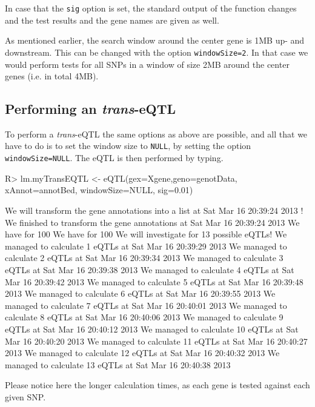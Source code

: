 \documentclass[a4paper,10pt]{article}
\begin{document}
In case that the \texttt{sig} option is set, the standard output of the function changes and the test results and the gene names
are given as well.

As mentioned earlier, the search window around the center gene is 1MB up- and downstream. This can be changed with the option
\texttt{windowSize=2}. In that case we would perform tests for all SNPs in a window of size 2MB around the center genes (i.e.
in total 4MB).


\subsection{Performing an \textit{trans}-eQTL}
To perform a \textit{trans}-eQTL the same options as above are possible, and all that we have to do is to set the window size to
\texttt{NULL}, by setting the option \texttt{windowSize=NULL}. The eQTL is then performed by typing.
\begin{Schunk}
\begin{Sinput}
R> lm.myTransEQTL <- eQTL(gex=Xgene,geno=genotData, xAnnot=annotBed, windowSize=NULL, sig=0.01)
\end{Sinput}
\begin{Soutput}
We will transform the gene annotations into a list at Sat Mar 16 20:39:24 2013 !
We finished to transform the gene annotations at Sat Mar 16 20:39:24 2013 
We have for 100 % of the samples in the expression data the genotype information. 
We have for 100 % of the expression data the annotations. 
We will investigate for 13 possible eQTLs! 
We managed to calculate 1 eQTLs at Sat Mar 16 20:39:29 2013 
We managed to calculate 2 eQTLs at Sat Mar 16 20:39:34 2013 
We managed to calculate 3 eQTLs at Sat Mar 16 20:39:38 2013 
We managed to calculate 4 eQTLs at Sat Mar 16 20:39:42 2013 
We managed to calculate 5 eQTLs at Sat Mar 16 20:39:48 2013 
We managed to calculate 6 eQTLs at Sat Mar 16 20:39:55 2013 
We managed to calculate 7 eQTLs at Sat Mar 16 20:40:01 2013 
We managed to calculate 8 eQTLs at Sat Mar 16 20:40:06 2013 
We managed to calculate 9 eQTLs at Sat Mar 16 20:40:12 2013 
We managed to calculate 10 eQTLs at Sat Mar 16 20:40:20 2013 
We managed to calculate 11 eQTLs at Sat Mar 16 20:40:27 2013 
We managed to calculate 12 eQTLs at Sat Mar 16 20:40:32 2013 
We managed to calculate 13 eQTLs at Sat Mar 16 20:40:38 2013 
\end{Soutput}
\end{Schunk}

Please notice here the longer calculation times, as each gene is tested against each given SNP.
\end{document}
